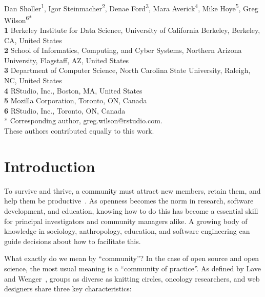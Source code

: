\documentclass[10pt,letterpaper]{article}
\date{}
\begin{document}
\vspace*{0.2in}

\begin{flushleft}
{\Large
\textbf{}
}
\newline
\\
{Dan Sholler}\textsuperscript{1{\ddag}},
{Igor Steinmacher}\textsuperscript{2{\ddag}},
{Denae Ford}\textsuperscript{3{\ddag}},
{Mara Averick}\textsuperscript{4{\ddag}},
{Mike Hoye}\textsuperscript{5{\ddag}},
{Greg Wilson}\textsuperscript{6{\ddag}*}
\\
\bigskip
\textbf{1} Berkeley Institute for Data Science, University of California Berkeley, Berkeley, CA, United States\\
\textbf{2} School of Informatics, Computing, and Cyber Systems, Northern Arizona University, Flagstaff, AZ, United States\\
\textbf{3} Department of Computer Science, North Carolina State University, Raleigh, NC, United States\\
\textbf{4} RStudio, Inc., Boston, MA, United States\\
\textbf{5} Mozilla Corporation, Toronto, ON, Canada\\
\textbf{6} RStudio, Inc., Toronto, ON, Canada\\
* Corresponding author, greg.wilson@rstudio.com. \\
\bigskip
{\ddag} These authors contributed equally to this work.
\end{flushleft}

\section*{Introduction}

To survive and thrive,
a community must attract new members,
retain them,
and help them be productive~\cite{qureshi2011}.
As openness becomes the norm in research, software development, and education,
knowing how to do this has become a essential skill
for principal investigators and community managers alike.
A growing body of knowledge in sociology, anthropology, education, and software engineering
can guide decisions about how to facilitate this.

What exactly do we mean by ``community''?
In the case of open source and open science,
the most usual meaning is a ``community of practice''.
As defined by Lave and Wenger~\cite{lave1991,wenger1999},
groups as diverse as knitting circles, oncology researchers, and web designers
share three key characteristics:
\end{document}
